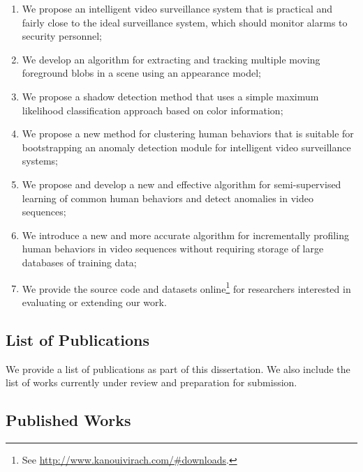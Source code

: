 \begin{enumerate}
  \item We propose an intelligent video surveillance system that is
    practical and fairly close to the ideal surveillance system, which
    should monitor \DIFdelbegin {}\DIFdelend \DIFaddbegin {}\DIFaddend alarms to security
    personnel;

  \item We develop an algorithm for extracting and tracking multiple 
    moving foreground blobs in a scene using an appearance model;

  \item We propose a shadow detection method that uses a simple
    maximum likelihood classification approach based on color
    information;

  \item We propose a new method for clustering human behaviors that 
    is suitable for bootstrapping an anomaly detection module for 
    intelligent video surveillance systems;

  \item We propose and develop a new and effective algorithm for
    semi-supervised learning of common human behaviors and detect 
    anomalies in video sequences;

  \item We introduce a new and more accurate algorithm for
    incrementally profiling human behaviors in video sequences without
    requiring storage of large databases of training data;

  \item We provide the source code and datasets
    online\footnote{See \url{http://www.kanouivirach.com/#downloads}.}
    for researchers interested in evaluating or extending our work.
\end{enumerate}

\subsection{List of Publications}

We provide a list of publications as part of this dissertation. We
also include the list of works currently under review and preparation
for submission.

\subsection*{Published Works}

